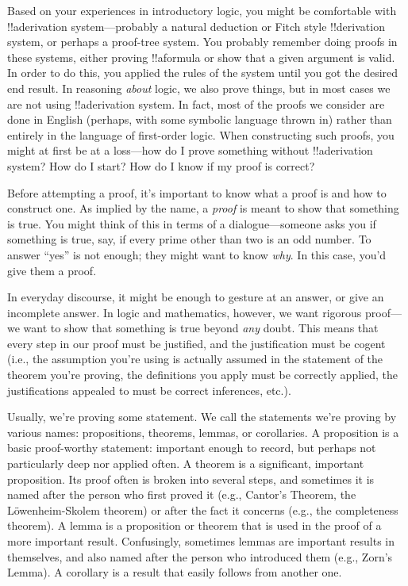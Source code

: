 \documentclass[../../../include/open-logic-section]{subfiles}
\begin{document}


Based on your experiences in introductory logic, you might be
comfortable with !!a{derivation} system---probably a natural deduction or
Fitch style !!{derivation} system, or perhaps a proof-tree system. You probably
remember doing proofs in these systems, either proving !!a{formula}
or show that a given argument is valid. In order to do this, you
applied the rules of the system until you got the desired end
result. In reasoning \emph{about} logic, we also prove things, but in
most cases we are not using !!a{derivation} system. In fact, most of the
proofs we consider are done in English (perhaps, with some symbolic
language thrown in) rather than entirely in the language of
first-order logic.  When constructing such proofs, you might at first
be at a loss---how do I prove something without !!a{derivation} system?  How
do I start? How do I know if my proof is correct?

Before attempting a proof, it's important to know what a proof is and
how to construct one.  As implied by the name, a \emph{proof} is meant
to show that something is true. You might think of this in terms of a
dialogue---someone asks you if something is true, say, if every prime
other than two is an odd number. To answer ``yes'' is not enough; they
might want to know \emph{why}. In this case, you'd give them a proof.

In everyday discourse, it might be enough to gesture at an answer, or
give an incomplete answer. In logic and mathematics, however, we want
rigorous proof---we want to show that something is true beyond \emph{any}
doubt. This means that every step in our proof must be justified, and
the justification must be cogent (i.e., the assumption you're using is
actually assumed in the statement of the theorem you're proving, the
definitions you apply must be correctly applied, the justifications
appealed to must be correct inferences, etc.).

Usually, we're proving some statement. We call the statements we're
proving by various names: propositions, theorems, lemmas, or
corollaries.  A proposition is a basic proof-worthy statement:
important enough to record, but perhaps not particularly deep nor
applied often. A theorem is a significant, important proposition. Its
proof often is broken into several steps, and sometimes it is named
after the person who first proved it (e.g., Cantor's Theorem, the
L\"owenheim-Skolem theorem) or after the fact it concerns (e.g., the
completeness theorem).  A lemma is a proposition or theorem that is
used in the proof of a more important result. Confusingly,
sometimes lemmas are important results in themselves, and also named
after the person who introduced them (e.g., Zorn's Lemma). A corollary
is a result that easily follows from another one.
\end{document}
